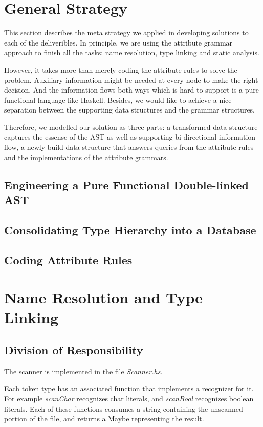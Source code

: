 \documentclass[12pt,letterpaper]{article}
\begin{document}
\section{General Strategy}
This section describes the meta strategy we applied in developing solutions to each of the deliveribles. In principle, we are using the attribute grammar approach to finish all the tasks: name resolution, type linking and static analysis.

However, it takes more than merely coding the attribute rules to solve the problem. Auxiliary information might be needed at every node to make the right decision. And the information flows both ways which is hard to support is a pure functional language like Haskell. Besides, we would like to achieve a nice separation between the supporting data structures and the grammar structures.

Therefore, we modelled our solution as three parts: a transformed data structure captures the essense of the AST as well as supporting bi-directional information flow, a newly build data structure that answers queries from the attribute rules and the implementations of the attribute grammars.

\subsection{Engineering a Pure Functional Double-linked AST}

\subsection{Consolidating Type Hierarchy into a Database}

\subsection{Coding Attribute Rules}



\section{Name Resolution and Type Linking}
\subsection{Division of Responsibility}
The scanner is implemented in the file \emph{Scanner.hs}.

Each token type has an associated function that implements a recognizer for it. For example \emph{scanChar} recognizes char literals, and \emph{scanBool} recognizes boolean literals. Each of these functions consumes a string containing the unscanned portion of the file, and returns a Maybe representing the result.
\end{document}
